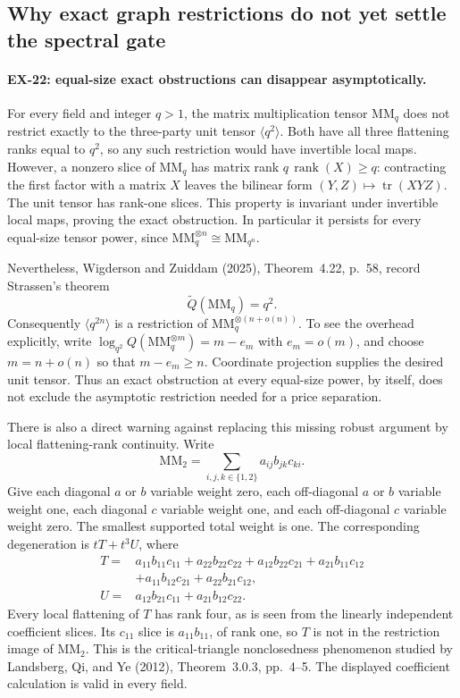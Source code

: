 \subsection{Why exact graph restrictions do not yet settle the spectral gate}
\label{sec:ex-robustness}

\paragraph{EX-22: equal-size exact obstructions can disappear asymptotically.}
For every field and integer $q>1$, the matrix multiplication tensor
$\mathrm{MM}_q$ does not restrict exactly to the three-party unit tensor
$\langle q^2\rangle$. Both have all three flattening ranks equal to
$q^2$, so any such restriction would have invertible local maps.
However, a nonzero slice of $\mathrm{MM}_q$ has matrix rank
$q\,\operatorname{rank}(X)\geq q$: contracting the first factor with a
matrix $X$ leaves the bilinear form $(Y,Z)\mapsto\operatorname{tr}(XYZ)$.
The unit tensor has rank-one slices. This property is invariant under
invertible local maps, proving the exact obstruction. In particular it
persists for every equal-size tensor power, since
$\mathrm{MM}_q^{\otimes n}\cong\mathrm{MM}_{q^n}$.

Nevertheless, Wigderson and Zuiddam (2025), Theorem~4.22, p.~58,
record Strassen's theorem
\[
 \widetilde{Q}(\mathrm{MM}_q)=q^2.
\]
Consequently $\langle q^{2n}\rangle$ is a restriction of
$\mathrm{MM}_q^{\otimes(n+o(n))}$. To see the overhead explicitly, write
$\log_{q^2}Q(\mathrm{MM}_q^{\otimes m})=m-e_m$ with
$e_m=o(m)$, and choose $m=n+o(n)$ so that $m-e_m\geq n$.
Coordinate projection supplies the desired unit tensor. Thus an exact
obstruction at every equal-size power, by itself, does not exclude the
asymptotic restriction needed for a price separation.

There is also a direct warning against replacing this missing robust
argument by local flattening-rank continuity. Write
\[
 \mathrm{MM}_2=\sum_{i,j,k\in\{1,2\}}a_{ij}b_{jk}c_{ki}.
\]
Give each diagonal $a$ or $b$ variable weight zero, each off-diagonal
$a$ or $b$ variable weight one, each diagonal $c$ variable weight one,
and each off-diagonal $c$ variable weight zero. The smallest supported
total weight is one. The corresponding degeneration is
$tT+t^3U$, where
\begin{align*}
 T={}&a_{11}b_{11}c_{11}+a_{22}b_{22}c_{22}
      +a_{12}b_{22}c_{21}+a_{21}b_{11}c_{12}\\
    &+a_{11}b_{12}c_{21}+a_{22}b_{21}c_{12},\\
 U={}&a_{12}b_{21}c_{11}+a_{21}b_{12}c_{22}.
\end{align*}
Every local flattening of $T$ has rank four, as is seen from the
linearly independent coefficient slices. Its $c_{11}$ slice is
$a_{11}b_{11}$, of rank one, so $T$ is not in the restriction image of
$\mathrm{MM}_2$. This is the critical-triangle nonclosedness phenomenon
studied by Landsberg, Qi, and Ye (2012), Theorem~3.0.3, pp.~4--5.
The displayed coefficient calculation is valid in every field.

